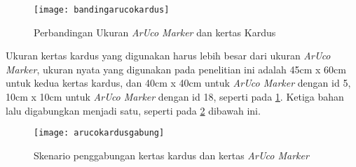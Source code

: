 \begin{packed_enum}
	\begin{figure}[H]
		\centering
		\texttt{[image: bandingarucokardus]}
		\caption{Perbandingan Ukuran \textit{ArUco Marker} dan kertas Kardus}
		\label{fig:bandingarucokardus}
	\end{figure}
	
	
	Ukuran kertas kardus yang digunakan harus lebih besar dari ukuran \textit{ArUco Marker}, ukuran nyata yang digunakan pada penelitian ini adalah 45cm x 60cm untuk kedua kertas kardus, dan 40cm x 40cm untuk \textit{ArUco Marker} dengan id 5, 10cm x 10cm untuk \textit{ArUco Marker} dengan id 18, seperti pada \cref{fig:bandingarucokardus}. Ketiga bahan lalu digabungkan menjadi satu, seperti pada \cref{fig:arucokardusgabung} dibawah ini.
	
	\begin{figure}[H]
		\centering
		\texttt{[image: arucokardusgabung]}
		\caption{Skenario penggabungan kertas kardus dan kertas \textit{ArUco Marker}}
		\label{fig:arucokardusgabung}
	\end{figure}
\end{packed_enum}

